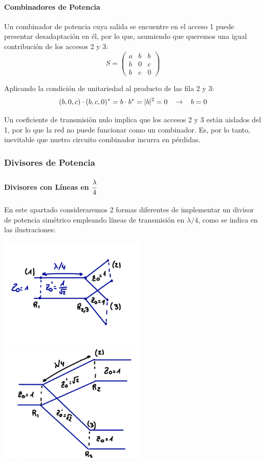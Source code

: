 \documentclass[12pt]{article}
\begin{document}
\paragraph{Combinadores de Potencia}

Un combinador de potencia cuya salida se encuentre en el acceso 1 puede presentar desadaptaci\'on en \'el, por lo que, asumiendo que queremos una igual contribuci\'on de los accesos 2 y 3:
$$S = \left(\begin{array}{ccc}
	a & b & b \\
	b & 0 & c \\
	b & c & 0
\end{array}\right)$$

Aplicando la condici\'on de unitariedad al producto de las fila 2 y 3:
$$(b , 0 , c) \cdot (b , c , 0)^* = b\cdot b^* = |b|^2 = 0
\hspace{0.3cm} \rightarrow  \hspace{0.3cm}
b = 0$$

Un coeficiente de transmisi\'on nulo implica que los accesos 2 y 3 est\'an aislados del 1, por lo que la red no puede funcionar como un combinador. Es, por lo tanto, inevitable que nuetro circuito combinador incurra en p\'erdidas.

\subsubsection{Divisores de Potencia}

\paragraph{Divisores con L\'ineas en $\cfrac{\lambda}{4}$}

En este apartado consideraremos 2 formas diferentes de implementar un divisor de potencia sim\'etrico empleando l\'ineas de transmisi\'on en $\lambda/4$, como se indica en las ilustraciones:
\begin{center}
	\includegraphics[width=7cm]{img/Divisor_en_lambda4_A.jpg}\includegraphics[width=7cm]{img/Divisor_en_lambda4_B.jpg}
\end{center}
\end{document}
